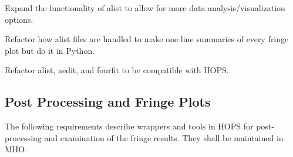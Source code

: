 \begin{description}
 Expand the functionality of \acs{alist} to allow for more data
    analysis/visualization options.

 Refactor how alist files are handled to make one line
    summaries of every fringe plot but do it in Python.
    
 Refactor alist, aedit, and fourfit to be compatible with \ac{HOPS}.

    
%

\end{description}



\subsection{Post Processing and Fringe Plots}
\label{sec:postprocreq}
The following requirements describe wrappers and tools
 in HOPS for post-processing and examination of the fringe results.
They shall be maintained in MHO. 


